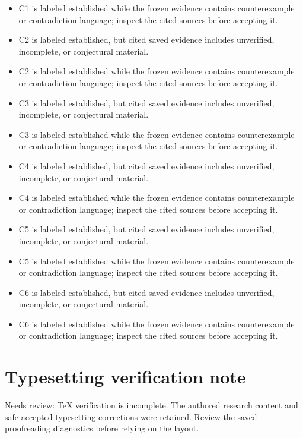 \documentclass[11pt]{article}
\begin{document}
\begin{itemize}
\item C1 is labeled established while the frozen evidence contains counterexample or contradiction language; inspect the cited sources before accepting it.
\item C2 is labeled established, but cited saved evidence includes unverified, incomplete, or conjectural material.
\item C2 is labeled established while the frozen evidence contains counterexample or contradiction language; inspect the cited sources before accepting it.
\item C3 is labeled established, but cited saved evidence includes unverified, incomplete, or conjectural material.
\item C3 is labeled established while the frozen evidence contains counterexample or contradiction language; inspect the cited sources before accepting it.
\item C4 is labeled established, but cited saved evidence includes unverified, incomplete, or conjectural material.
\item C4 is labeled established while the frozen evidence contains counterexample or contradiction language; inspect the cited sources before accepting it.
\item C5 is labeled established, but cited saved evidence includes unverified, incomplete, or conjectural material.
\item C5 is labeled established while the frozen evidence contains counterexample or contradiction language; inspect the cited sources before accepting it.
\item C6 is labeled established, but cited saved evidence includes unverified, incomplete, or conjectural material.
\item C6 is labeled established while the frozen evidence contains counterexample or contradiction language; inspect the cited sources before accepting it.
\end{itemize}
\section*{Typesetting verification note}
Needs review: TeX verification is incomplete. The authored research content and safe accepted typesetting corrections were retained. Review the saved proofreading diagnostics before relying on the layout.
\end{document}
